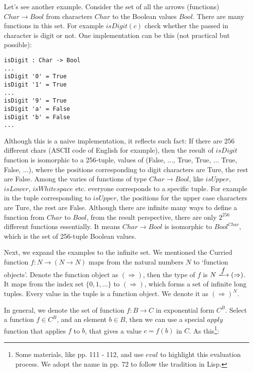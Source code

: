 \documentclass{article}
\begin{document}
\begin{example}
\normalfont
Let's see another example. Consider the set of all the arrows (functions) $Char \to Bool$ from characters $Char$ to the Boolean values $Bool$. There are many functions in this set. For example $isDigit(c)$ check whether the passed in character is digit or not. One implementation can be this (not practical but possible):

\lstset{frame=none}
\begin{lstlisting}[style=Haskell]
isDigit : Char -> Bool
...
isDigit '0' = True
isDigit '1' = True
...
isDigit '9' = True
isDigit 'a' = False
isDigit 'b' = False
...
\end{lstlisting}

Although this is a naive implementation, it reflects such fact: If there are 256 different chars (ASCII code of English for example), then the result of $isDigit$ function is isomorphic to a 256-tuple, values of (False, ..., True, True, ... True, False, ...), where the positions corresponding to digit characters are Ture, the rest are False. Among the varies of functions of type $Char \to Bool$, like $isUpper$, $isLower$, $isWhitespace$ etc. everyone corresponds to a specific tuple. For example in the tuple corresponding to $isUpper$, the positions for the upper case characters are Ture, the rest are False. Although there are infinite many ways to define a function from $Char$ to $Bool$, from the result perspective, there are only $2^{256}$ different functions essentially. It means $Char \to Bool$ is isomorphic to $Bool^{Char}$, which is the set of 256-tuple Boolean values.
\end{example}

Next, we expand the examples to the infinite set. We mentioned the Curried function $f: N \to (N \to N)$ maps from the natural numbers $N$ to `function objects'. Denote the function object as $(\Rightarrow)$, then the type of $f$ is $N \arrowto{f} (\Rightarrow)$. It maps from the index set $\{0, 1, ...\}$ to $(\Rightarrow)$, which forms a set of infinite long tuples. Every value in the tuple is a function object. We denote it as $(\Rightarrow)^N$.

In general, we denote the set of function $f : B \to C$ in exponential form $C^B$. Select a function $f \in C^B$, and an element $b \in B$, then we can use a special $apply$ function that applies $f$ to $b$, that gives a value $c = f(b)$ in $C$. As this\footnote{Some materials, like \cite{PeterSmith2018} pp. 111 - 112, and \cite{Wiki-Exponentials} use $eval$ to highlight this evaluation process. We adopt the name in \cite{Bird97} pp. 72 to follow the tradition in Lisp.}:
\end{document}
